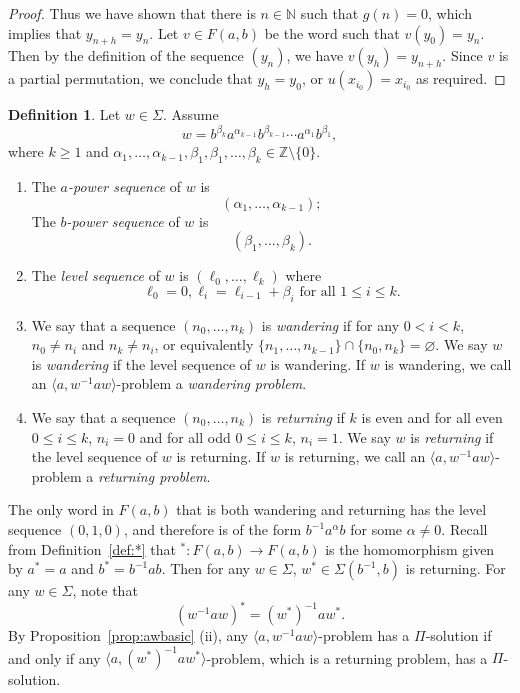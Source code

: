 \documentclass[10pt,a4paper]{amsart}
\theoremstyle{definition}
\newtheorem{definition}[theorem]{Definition}
\theoremstyle{definition}
\numberwithin{equation}{section}
\begin{document}
\begin{proof}
Thus we have shown that there is $n\in\mathbb{N}$ such that $g(n)=0$, which implies that $y_{n+h}=y_n$. Let $v\in F(a, b)$ be the word such that $v(y_0)=y_n$. Then by the definition of the sequence $(y_n)$, we have $v(y_h)=y_{n+h}$. Since $v$ is a partial permutation, we conclude that $y_h=y_0$, or $u(x_{i_0})=x_{i_0}$ as required.
\end{proof}



\begin{definition} Let $w\in \Sigma$. Assume
$$ w=b^{\beta_k}a^{\alpha_{k-1}}b^{\beta_{k-1}}\cdots a^{\alpha_1}b^{\beta_1}, $$
where $k\geq 1$ and $\alpha_1,\dots, \alpha_{k-1}, \beta_1,\beta_1, \dots, \beta_k\in \mathbb{Z}\setminus\{0\}$. 
\begin{enumerate}
\item[(1)] The {\em $a$-power sequence} of $w$ is 
$$ (\alpha_1, \dots, \alpha_{k-1}); $$
The {\em $b$-power sequence} of $w$ is 
$$ (\beta_1, \dots, \beta_k). $$
\item[(2)] The {\em level sequence} of $w$ is $(\ell_0,\dots, \ell_k)$ where
$$ \ell_0=0, \ell_{i}=\ell_{i-1}+\beta_i \mbox{ for all $1\leq i\leq k$.} $$
\item[(3)] We say that a sequence $(n_0, \dots, n_k)$ is {\em wandering} if for any $0<i<k$, $n_0\neq n_i$ and $n_k\neq n_i$, or equivalently $\{n_1, \dots, n_{k-1}\}\cap \{n_0, n_k\}=\varnothing$. We say $w$ is {\em wandering} if the level sequence of $w$ is wandering. If $w$ is wandering, we call an $\langle a, w^{-1}aw\rangle$-problem a {\em wandering problem}.
\item[(4)] We say that a sequence $(n_0, \dots, n_k)$ is {\em returning} if $k$ is even and for all even $0\leq i\leq k$, $n_i=0$ and for all odd $0\leq i\leq k$, $n_i=1$. We say $w$ is {\em returning} if the level sequence of $w$ is returning. If $w$ is returning, we call an $\langle a,w^{-1}aw\rangle$-problem a {\em returning problem}.
\end{enumerate}
\end{definition}

The only word in $F(a, b)$ that is both wandering and returning has the level sequence $(0,1,0)$, and therefore is of the form $b^{-1}a^\alpha b$ for some $\alpha\neq 0$. Recall from Definition~\ref{def:*} that ${}^*\colon F(a, b)\to F(a, b)$ is the homomorphism given by $a^*=a$ and $b^*=b^{-1}ab$. Then for any $w\in \Sigma$, $w^*\in \Sigma(b^{-1}, b)$ is returning. For any $w\in \Sigma$, note that 
$$ (w^{-1}aw)^*=(w^*)^{-1}aw^*. $$
By Proposition~\ref{prop:awbasic} (ii), any $\langle a, w^{-1}aw\rangle$-problem has a $\Pi$-solution if and only if any $\langle a, (w^*)^{-1}aw^*\rangle$-problem, which is a returning problem, has a $\Pi$-solution. 
\end{document}

